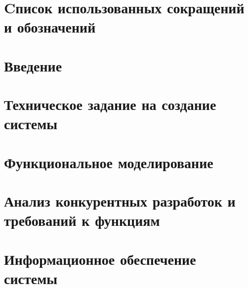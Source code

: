 \documentclass[a4paper,utf8,pointsection,nocolumnvii,nocolumnviii,nocolumnsxix,pointsubsection]{eskdtext}
\begin{document}
\renewcommand{\figurename}{Рис.}



\onehalfspacing
{}



\newpage


\newpage


\newpage
\tableofcontents

\newpage
{}
\section*{Cписок использованных сокращений и обозначений}


\newpage
{}
\section*{Введение}


\newpage
{}
\section{Техническое задание на создание системы} \label{sec:specification}


\newpage
{}
\section{Функциональное моделирование}\label{sec:funcprot}


\newpage
{}
\section{Анализ конкурентных разработок и требований к функциям} \label{sec:concurents}


\newpage
{}
\section{Информационное обеспечение системы} \label{sec:informational-supply}

\end{document}
